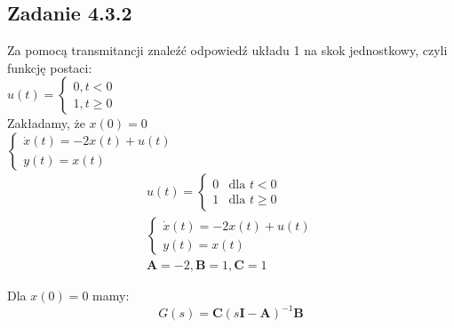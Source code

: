 \subsection*{Zadanie 4.3.2} {\color{darkgray}
	Za pomocą transmitancji znaleźć odpowiedź układu 1 na skok jednostkowy, czyli funkcję postaci:\\
	$u(t)=\begin{cases}0,t<0 \\ 1, t\geqslant 0 \end{cases}$\\
	Zakładamy, że $x(0)=0$\\
	
	$
\begin{cases}
\dot{x}(t) = -2x(t) + u(t) \\
y(t) = x(t)
\end{cases}$ \\
}\lineh
\begin{gather*}
u(t) = \begin{cases}
0 & \text{dla } t < 0 \\
1 & \text{dla } t \geqslant  0
\end{cases} \\
\begin{cases}
\dot{x}(t) = -2x(t) + u(t) \\
y(t) = x(t)
\end{cases} \\
\mathbf{A} = -2, \mathbf{B} = 1, \mathbf{C} = 1
\end{gather*}

Dla $x(0) = 0$ mamy:
\[ G(s) = \mathbf{C} (s\mathbf{I} - \mathbf{A})^{-1} \mathbf{B} \]

